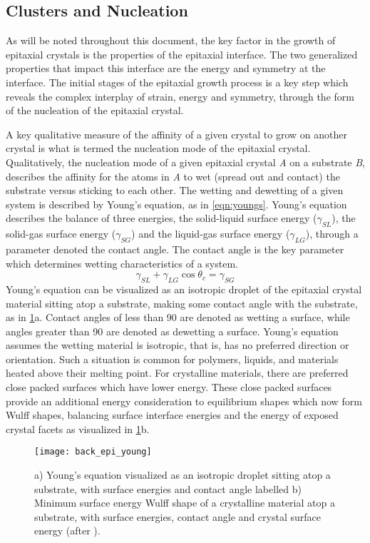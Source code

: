 \subsection{Clusters and Nucleation} As will be noted throughout this document, the key factor in the growth of epitaxial crystals is the properties of the epitaxial interface.
The two generalized properties that impact this interface are the energy and symmetry at the interface.
The initial stages of the epitaxial growth process is a key step which reveals the complex interplay of strain, energy and symmetry, through the form of the nucleation of the epitaxial crystal.

A key qualitative measure of the affinity of a given crystal to grow on another crystal is what is termed the nucleation mode of the epitaxial crystal.
Qualitatively, the nucleation mode of a given epitaxial crystal \emph{A} on a substrate \emph{B}, describes the affinity for the atoms in \emph{A} to wet (spread out and contact) the substrate versus sticking to each other.
The wetting and dewetting of a given system is described by Young's equation, as in \cref{eqn:youngs}.
Young's equation describes the balance of three energies, the solid-liquid surface energy (\(\gamma_{SL}\)), the solid-gas surface energy (\(\gamma_{SG}\)) and the liquid-gas surface energy (\(\gamma_{LG}\)), through a parameter denoted the contact angle.
The contact angle is the key parameter which determines wetting characteristics of a system.
\begin{equation}
 \gamma_{SL} + \gamma_{LG} \cos{\theta_c} = \gamma_{SG} \label{eqn:youngs}
\end{equation}
Young's equation can be visualized as an isotropic droplet of the epitaxial crystal material sitting atop a substrate, making some contact angle with the substrate, as in \cref{fig:back_epi_young}a.
Contact angles of less than 90\degree{} are denoted as wetting a surface, while angles greater than 90\degree{} are denoted as dewetting a surface.
Young's equation assumes the wetting material is isotropic, that is, has no preferred direction or orientation.
Such a situation is common for polymers, liquids, and materials heated above their melting point.
For crystalline materials, there are preferred close packed surfaces which have lower energy.
These close packed surfaces provide an additional energy consideration to equilibrium shapes which now form Wulff shapes, balancing surface interface energies and the energy of exposed crystal facets\cite{Venables1984} as visualized in \cref{fig:back_epi_young}b.
\begin{figure}
 \centering \texttt{[image: back\_epi\_young]}
 \caption[Young's equation]{\label{fig:back_epi_young}a) Young's equation visualized as an isotropic droplet sitting atop a substrate, with surface energies and contact angle labelled b) Minimum surface energy Wulff shape of a crystalline material atop a substrate, with surface energies, contact angle and crystal surface energy (after \cite{wikipedia_surface_energy}).}
\end{figure}

